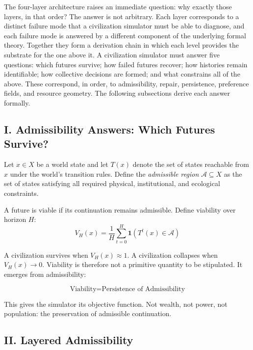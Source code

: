 \documentclass[12pt]{article}
\begin{document}
The four-layer architecture raises an immediate question: why exactly those layers, in that order? The answer is not arbitrary. Each layer corresponds to a distinct failure mode that a civilization simulator must be able to diagnose, and each failure mode is answered by a different component of the underlying formal theory. Together they form a derivation chain in which each level provides the substrate for the one above it. A civilization simulator must answer five questions: which futures survive; how failed futures recover; how histories remain identifiable; how collective decisions are formed; and what constrains all of the above. These correspond, in order, to admissibility, repair, persistence, preference fields, and resource geometry. The following subsections derive each answer formally.

\subsection{I. Admissibility Answers: Which Futures Survive?}

Let $x \in X$ be a world state and let $T(x)$ denote the set of states reachable from $x$ under the world's transition rules. Define the \emph{admissible region} $\mathcal{A} \subseteq X$ as the set of states satisfying all required physical, institutional, and ecological constraints.

A future is viable if its continuation remains admissible. Define viability over horizon $H$:
\begin{equation}
  V_H(x) = \frac{1}{H} \sum_{t=0}^{H} \mathbf{1}\!\left(T^t(x) \in \mathcal{A}\right)
\end{equation}

A civilization survives when $V_H(x) \approx 1$. A civilization collapses when $V_H(x) \to 0$. Viability is therefore not a primitive quantity to be stipulated. It emerges from admissibility:

\begin{equation}
  \boxed{\text{Viability} = \text{Persistence of Admissibility}}
\end{equation}

This gives the simulator its objective function. Not wealth, not power, not population: the preservation of admissible continuation.

\subsection{II. Layered Admissibility}
\end{document}
